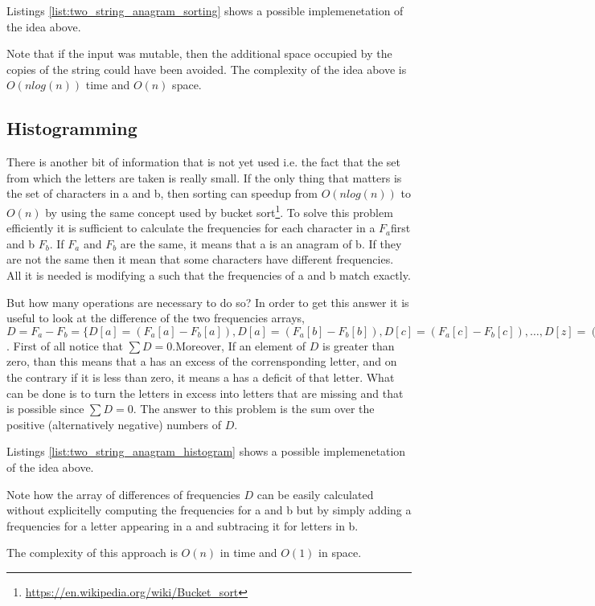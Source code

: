 Listings \ref{list:two_string_anagram_sorting} shows a possible implemenetation of the idea above. 


	


Note that if the input was mutable, then the additional space occupied by the copies of the string could have been avoided.
The complexity of the idea above is $O(n log(n))$ time and $O(n)$ space.

\subsection{Histogramming}
There is another bit of information that is not yet used i.e. the fact that the set from which the letters are taken is really small. 
If the only thing that matters is the set of characters in a and b, then sorting can speedup from $O(n log(n))$ to $O(n)$ by using the same concept used by bucket sort\footnote{\url{https://en.wikipedia.org/wiki/Bucket_sort}}.
To solve this problem efficiently it is sufficient  to calculate the frequencies for each character in a $F_a$first and b $F_b$. If $F_a$ and $F_b$ are the same, it means that a is an anagram of b. If they are not the same then it mean that some characters have different frequencies. All it is needed is modifying a such that the frequencies of a and b match exactly. 

But how many operations are necessary to do so?  In order to get this answer it is useful to look at the difference of the two frequencies arrays, $D = F_a - F_b = \{D[a] = (F_a[a] - F_b[a]), D[a] = (F_a[b] - F_b[b]), D[c] = (F_a[c] - F_b[c]), \ldots, D[z] = (F_a[z] - F_b[z])\}$. First of all notice that $\sum D = 0$.Moreover, If an element of $D$ is greater than zero, than this means that a has an excess of the corrensponding letter, and on the contrary if it is less than zero, it means a has a deficit of that letter. What can be done is to turn the letters in excess into letters that are missing and that is possible since $\sum D = 0$. 
The answer to this problem is the sum over the positive (alternatively negative) numbers of $D$. 

Listings \ref{list:two_string_anagram_histogram} shows a possible implemenetation of the idea above. 


	


Note how the array of differences of frequencies $D$ can be easily calculated without explicitelly computing the frequencies for a and b but by simply adding a frequencies for a letter appearing in a and subtracing it for letters in b. 

The complexity of this approach is $O(n)$ in time and $O(1)$ in space. 